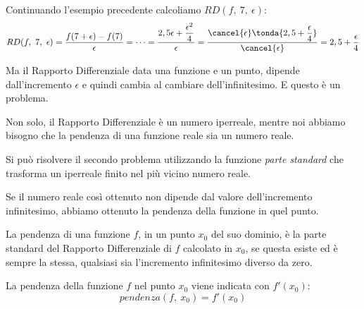 Continuando l'esempio precedente calcoliamo \(RD(f,~7,~\epsilon)\):
\[RD(f,~7,~\epsilon) =
 \frac{f(7+\epsilon) - f(7)}{\epsilon}=\dots=
 \frac{2,5 \epsilon + \dfrac{\epsilon^2}{4}}{\epsilon}=
 \frac{\cancel{\epsilon}\tonda{2,5 + \dfrac{\epsilon}{4}}}
 {\cancel{\epsilon}}=
 2,5 + \frac{\epsilon}{4}
\]

Ma il Rapporto Differenziale data una funzione e un punto, dipende 
dall'incremento \(\epsilon\) e quindi cambia al cambiare dell'infinitesimo. 
E questo è un problema. 

Non solo, il Rapporto Differenziale è un numero iperreale, mentre noi 
abbiamo bisogno che la pendenza di una funzione reale sia un numero reale.

Si può risolvere il secondo problema utilizzando la funzione 
\emph{parte standard} che trasforma un iperreale finito nel più vicino
numero reale.

Se il numero reale così ottenuto non dipende dal valore dell'incremento 
infinitesimo, abbiamo ottenuto la pendenza della funzione in quel punto.

% 
\begin{definizione}
La pendenza di una funzione \(f\), in un punto \(x_0\) del suo dominio, 
è la parte standard del Rapporto Differenziale di \(f\) calcolato in 
\(x_0\), se questa esiste ed è sempre la stessa, qualsiasi sia 
l'incremento infinitesimo diverso da zero.
\end{definizione}

La pendenza della funzione \(f\) nel punto \(x_0\) viene indicata con 
\(f'(x_0)\):
\[pendenza(f,~x_0) = f'(x_0)\]


